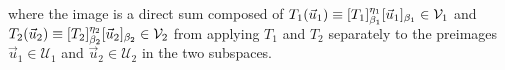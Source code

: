 where the image is a direct sum composed of $T_1(\vec{u}_1) \equiv \smash{[T_1]_{\beta_1}^{\eta_1}}[\vec{u}_1]_{\beta_1} \in \mathcal{V}_1$ and $T_2(\vec{u}_2) \equiv \smash{[T_2]_{\beta_2}^{\eta_2}}[\vec{u}_2]_{\beta_2} \in \mathcal{V}_2$ from applying $T_1$ and $T_2$ separately to the preimages $\vec{u}_1 \in \mathcal{U}_1$ and $\vec{u}_2 \in \mathcal{U}_2$ in the two subspaces.
